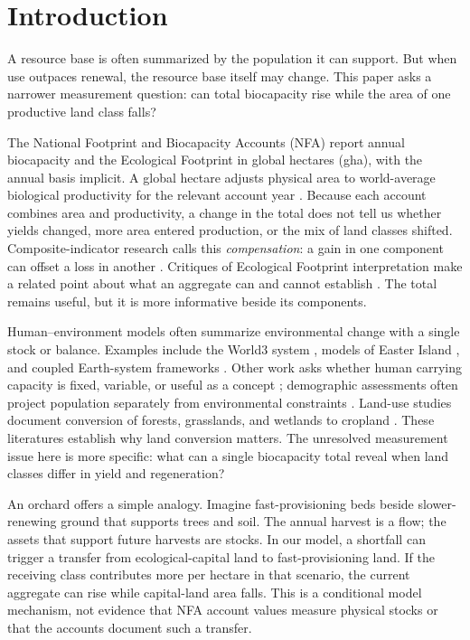 \documentclass[preprint,12pt,authoryear]{elsarticle}
\begin{document}
\section{Introduction}\label{sec:intro}

A resource base is often summarized by the population it can support. But when use outpaces renewal, the resource base itself may change. This paper asks a narrower measurement question: can total biocapacity rise while the area of one productive land class falls?

The National Footprint and Biocapacity Accounts (NFA) report annual biocapacity and the Ecological Footprint in global hectares (gha), with the annual basis implicit. A global hectare adjusts physical area to world-average biological productivity for the relevant account year \citep{GFNStandards2009,GFNGuidebook2019}. Because each account combines area and productivity, a change in the total does not tell us whether yields changed, more area entered production, or the mix of land classes shifted. Composite-indicator research calls this \emph{compensation}: a gain in one component can offset a loss in another \citep{Nardo2008,Becker2017,Fischer2022}. Critiques of Ecological Footprint interpretation make a related point about what an aggregate can and cannot establish \citep{Blomqvist2013,GiampietroSaltelli2014,vdBerghGrazi2015,Galli2016}. The total remains useful, but it is more informative beside its components.

Human--environment models often summarize environmental change with a single stock or balance. Examples include the World3 system \citep{Meadows1972,Meadows1974,Meadows2004}, models of Easter Island \citep{BranderTaylor1998,Anderies2000}, and coupled Earth-system frameworks \citep{Motesharrei2016,Donges2017,CalvinBondLamberty2018,HendersonLoreau2018}. Other work asks whether human carrying capacity is fixed, variable, or useful as a concept \citep{Cohen1995,vdBerghRietveld2004,Simon1996,Meyer1994,MeyerAusubel1999,Dasgupta2021}; demographic assessments often project population separately from environmental constraints \citep{UN2022}. Land-use studies document conversion of forests, grasslands, and wetlands to cropland \citep{Haberl2007,Krausmann2013,Erb2017}. These literatures establish why land conversion matters. The unresolved measurement issue here is more specific: what can a single biocapacity total reveal when land classes differ in yield and regeneration?

An orchard offers a simple analogy. Imagine fast-provisioning beds beside slower-renewing ground that supports trees and soil. The annual harvest is a flow; the assets that support future harvests are stocks. In our model, a shortfall can trigger a transfer from ecological-capital land to fast-provisioning land. If the receiving class contributes more per hectare in that scenario, the current aggregate can rise while capital-land area falls. This is a conditional model mechanism, not evidence that NFA account values measure physical stocks or that the accounts document such a transfer.
\end{document}
